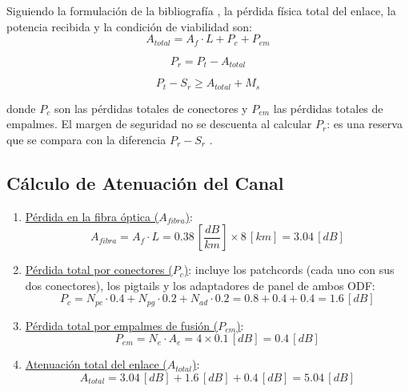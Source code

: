 Siguiendo la formulación de la bibliografía \cite{b7}, la pérdida física total del enlace, la potencia recibida y la condición de viabilidad son:
\begin{equation}
    A_{total} = A_f \cdot L + P_c + P_{em}
    \label{eq_1}
\end{equation}

\begin{equation}
    P_{r} = P_{t} - A_{total}
    \label{eq_2}
\end{equation}

\begin{equation}
    P_{t} - S_{r} \geq A_{total} + M_s
    \label{eq_3}
\end{equation}

donde $P_c$ son las pérdidas totales de conectores y $P_{em}$ las pérdidas totales de empalmes. El margen de seguridad no se descuenta al calcular $P_r$: es una reserva que se compara con la diferencia $P_r - S_r$ \cite{b7}.


\subsection{Cálculo de Atenuación del Canal}
\label{sec_3.2}
\begin{enumerate}
    \item \underline{Pérdida en la fibra óptica ($A_{fibra}$)}:
    \begin{equation}
        A_{fibra} = A_f \cdot L = 0.38 \, \left[\frac{dB}{km}\right] \times 8 \, [km] = 3.04 \, [dB]
        \label{eq_4}
    \end{equation}

    \item \underline{Pérdida total por conectores ($P_c$)}: incluye los patchcords (cada uno con sus dos conectores), los pigtails y los adaptadores de panel de ambos ODF:
    \begin{equation}
        P_c = N_{pc} \cdot 0.4 + N_{pg} \cdot 0.2 + N_{ad} \cdot 0.2 = 0.8 + 0.4 + 0.4 = 1.6 \, [dB]
        \label{eq_5}
    \end{equation}

    \item \underline{Pérdida total por empalmes de fusión ($P_{em}$)}:
    \begin{equation}
        P_{em} = N_e \cdot A_e = 4 \times 0.1 \, [dB] = 0.4 \, [dB]
        \label{eq_6}
    \end{equation}

    \item \underline{Atenuación total del enlace ($A_{total}$)}:
    \begin{equation}
        A_{total} = 3.04 \, [dB] + 1.6 \, [dB] + 0.4 \, [dB] = 5.04 \, [dB]
        \label{eq_7}
    \end{equation}
\end{enumerate}

